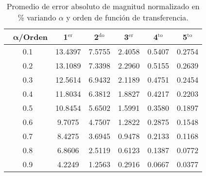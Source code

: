 	\begin{table}[!ht]                                 
	\centering            
	\caption{Promedio de error absoluto de magnitud normalizado en \% variando $\alpha$ y orden de función de transferencia.}                           
	\label{tab:prom_error_mag_norm}                               
		\begin{tabular}{cccccc}
			\hline                                             
			$\,\,\,\,\bm{\alpha}$\textbf{/Orden} & \textbf{1$^{\mathrm{er}}$} & \textbf{2$^{\mathrm{do}}$} & \textbf{3$^{\mathrm{er}}$} & \textbf{4$^{\mathrm{to}}$} & \textbf{5$^{\mathrm{to}}$} \\                     
			\hline                                             
			0.1 & 13.4397 & 7.5755 & 2.4058 & 0.5407 & 0.2754 \\
			                                         
			0.2 & 13.1089 & 7.3398 & 2.2960 & 0.5155 & 0.2639 \\
			                                              
			0.3 & 12.5614 & 6.9432 & 2.1189 & 0.4751 & 0.2454 \\
			                                            
			0.4 & 11.8034 & 6.3812 & 1.8827 & 0.4217 & 0.2203 \\
			                                            
			0.5 & 10.8454 & 5.6502 & 1.5991 & 0.3580 & 0.1897 \\
			                                           
			0.6 & 9.7075 & 4.7507 & 1.2822 & 0.2875 & 0.1548 \\ 
			                                         
			0.7 & 8.4275 & 3.6945 & 0.9478 & 0.2133 & 0.1168 \\ 
			                                              
			0.8 & 6.8606 & 2.5119 & 0.6123 & 0.1387 & 0.0772 \\ 
			                                             
			0.9 & 4.2249 & 1.2563 & 0.2916 & 0.0667 & 0.0377 \\ 
			\hline                                             
		\end{tabular}                                                             
	\end{table}


